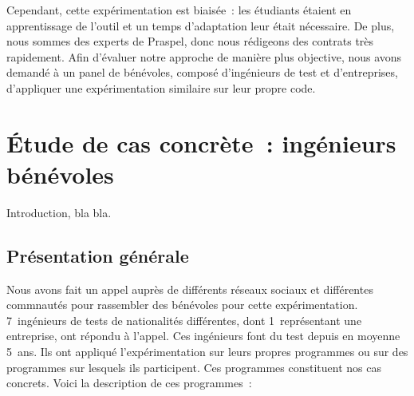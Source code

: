 Cependant, cette expérimentation est biaisée~: les étudiants étaient en
apprentissage de l'outil et un temps d'adaptation leur était nécessaire. De
plus, nous sommes des experts de Praspel, donc nous rédigeons des contrats très
rapidement. Afin d'évaluer notre approche de manière plus objective, nous avons
demandé à un panel de bénévoles, composé d'ingénieurs de test et d'entreprises,
d'appliquer une expérimentation similaire sur leur propre code.

\section{Étude de cas concrète~: ingénieurs bénévoles}
\label{section:experimentation:real}

Introduction, bla bla.

\subsection{Présentation générale}

Nous avons fait un appel auprès de différents réseaux sociaux et différentes
commnautés pour rassembler des bénévoles pour cette expérimentation.
7~ingénieurs de tests de nationalités différentes, dont 1~représentant une
entreprise, ont répondu à l'appel. Ces ingénieurs font du test depuis en moyenne
5~ans. Ils ont appliqué l'expérimentation sur leurs propres programmes ou sur
des programmes sur lesquels ils participent. Ces programmes constituent nos cas
concrets. Voici la description de ces programmes~:

